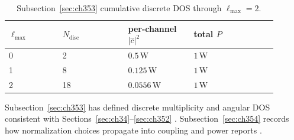 \begin{table}[t]
\centering
\caption{Subsection~\ref{sec:ch353} cumulative discrete DOS through \(\ell_{\max}=2\).}
\label{tab:ch3.353-cumulative-ledger}
\small
\begin{tabular}{@{}p{0.18\linewidth}p{0.22\linewidth}p{0.22\linewidth}p{0.28\linewidth}@{}}
\toprule
\(\ell_{\max}\) & \(N_{\mathrm{disc}}\) & per-channel \(|\widehat{c}|^{2}\) & total \(P\) \\
\midrule
0 & 2 & $0.5\,\mathrm{W}$ & $1\,\mathrm{W}$ \\
1 & 8 & $0.125\,\mathrm{W}$ & $1\,\mathrm{W}$ \\
2 & 18 & $0.0556\,\mathrm{W}$ & $1\,\mathrm{W}$ \\
\bottomrule
\end{tabular}
\end{table}
Subsection~\ref{sec:ch353} has defined discrete multiplicity and angular DOS consistent with Sections~\ref{sec:ch34}--\ref{sec:ch352}
\cite{jackson1999}. Subsection~\ref{sec:ch354} records how normalization choices propagate into
coupling and power reports \cite{stratton1941}.
